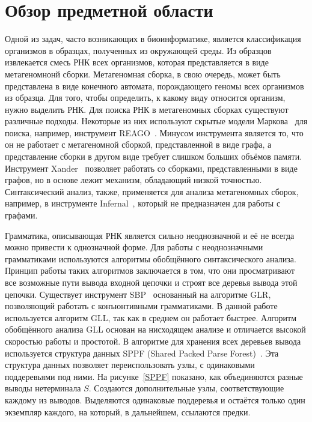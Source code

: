 
\section{Обзор предметной области}
Одной из задач, часто возникающих в биоинформатике, является классификация организмов в образцах, полученных из окружающей среды. Из образцов извлекается смесь РНК всех организмов, которая представляется в виде метагеномнонй сборки. Метагеномная сборка, в свою очередь, может быть представлена в виде конечного автомата, порождающего геномы всех организмов из образца. Для того, чтобы определить, к какому виду относится организм, нужно выделить РНК. Для поиска РНК в метагеномных сборках существуют различные подходы. Некоторые из них используют скрытые модели Маркова~\cite{markov} для поиска, например, инструмент REAGO~\cite{REAGO}. Минусом инструмента является то, что он не работает с метагеномной сборкой, представленной в виде графа, а представление сборки в другом виде требует слишком больших объёмов памяти. Инструмент Xander~\cite{Xander} позволяет работать со сборками, представленными в виде графов, но в основе лежит механизм, обладающий низкой точностью. Синтаксический анализ, также, применяется для анализа метагеномных сборок, например, в инструменте Infernal~\cite{Infernal}, который не предназначен для работы с графами.

Грамматика, описывающая РНК является сильно неоднозначной и её не всегда можно привести к однозначной форме. Для работы с неоднозначными грамматиками используются алгоритмы обобщённого синтаксического анализа. Принцип работы таких алгоритмов заключается в том, что они просматривают все возможные пути вывода входной цепочки и строят все деревья вывода этой цепочки. Существует инструмент SBP~\cite{SBP} основанный на алгоритме GLR, позволяющий работать с конъюнтивными грамматиками. В данной работе используется алгоритм GLL, так как в среднем он работает быстрее. Алгоритм обобщённого анализа GLL основан на нисходящем анализе и отличается высокой скоростью работы и простотой. В алгоритме для хранения всех деревьев вывода используется структура данных SPPF (Shared Packed Parse Forest)~\cite{SPPF}. Эта структура данных позволяет переиспользовать узлы, с одинаковыми поддеревьями под ними. На рисунке~\ref{SPPF} показано, как объединяются разные выводы нетерминала $ S $. Создаются дополнительные узлы, соответствующие каждому из выводов. Выделяются одинаковые поддеревья и остаётся только один экземпляр каждого, на который, в дальнейшем, ссылаются предки.

